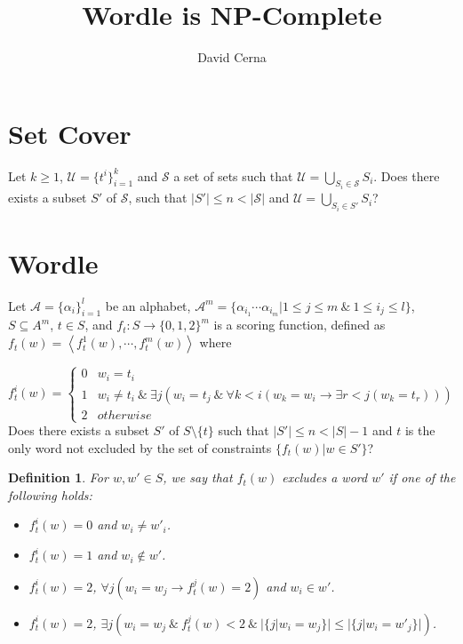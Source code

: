 \documentclass[10pt,a4paper]{article}
\author{David Cerna}
\title{Wordle is NP-Complete}
\newtheorem{definition}{Definition}
\begin{document}
\maketitle
\section{Set Cover}
Let $k\geq 1$,  $\mathcal{U}= \{t^{i}\}^{k}_{i=1}$ and $\mathcal{S}$ a set of sets such that $\mathcal{U} =\bigcup_{S_i\in \mathcal{S}} S_i$. Does there exists a subset $S'$ of $\mathcal{S}$, such that $\vert S'\vert \leq n< \vert \mathcal{S}\vert$ and 
$\mathcal{U} =\bigcup_{S_i\in S'} S_i$?

\section{Wordle}
Let $\mathcal{A}= \{\alpha_{i}\}^{l}_{i=1}$ be an alphabet, $\mathcal{A}^{m} =\{ \alpha_{i_1}\cdots \alpha_{i_m}\vert 1\leq j\leq m\ \& \ 1\leq i_j\leq l\}$,  $S\subseteq A^m$, $t\in S$, and  $f_t:S\rightarrow \{0,1,2\}^m$ is a scoring function, defined as $f_t(w) = \left\langle f_t^1(w),\cdots, f_t^{m}(w)\right\rangle$ where

$$f_t^i(w) =\left\lbrace \begin{array}{cc}
0 &  w_i = t_i \\
1 & w_i \not = t_i\ \&\ \exists j(w_i = t_j \ \& \ \forall k< i(w_k =w_i \rightarrow \exists r< j (w_k=t_r)))\\
2 & otherwise
\end{array}\right.$$
Does there exists a subset $S'$ of $S\setminus \{t\}$ such that $\vert S'\vert \leq n< \vert S\vert-1 $ and $t$ is the only word not excluded by the set of constraints $\{f_t(w)\vert w\in S'\}$?

\begin{definition}
For $w,w'\in S$, we say that $f_t(w)$ excludes a word $w'$ if one of the following holds: 

\begin{itemize}
\item $f_t^i(w) = 0$ and $w_i\not= w'_i $. 
\item $f_t^i(w) = 1$ and $w_i \not \in w'$.
\item $f_t^i(w) = 2$, $\forall j( w_i = w_j\rightarrow f_t^j(w) = 2)$ and $w_i\in w'$.
\item $f_t^i(w) = 2$,  $\exists j( w_i = w_j \ \&\ f_t^j(w) < 2 \ \& \ \vert\{j\vert w_i=w_j\}\vert\leq \vert\{j\vert w_i=w'_j\}\vert)$.
\end{itemize}
\end{definition}
\end{document}
